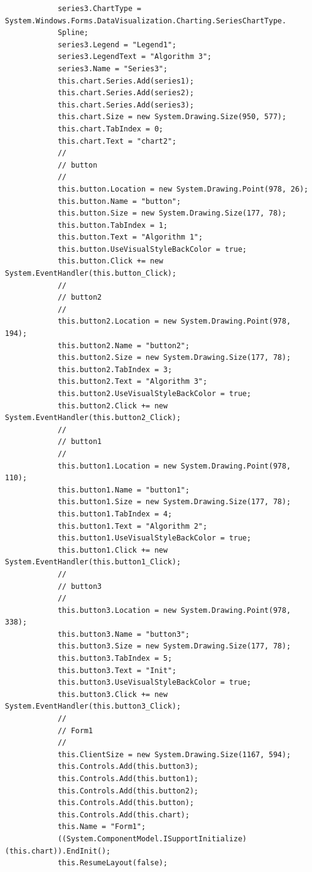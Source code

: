 \documentclass[a4paper]{article}
\begin{document}
\begin{verbatim}
            series3.ChartType = System.Windows.Forms.DataVisualization.Charting.SeriesChartType.
            Spline;
            series3.Legend = "Legend1";
            series3.LegendText = "Algorithm 3";
            series3.Name = "Series3";
            this.chart.Series.Add(series1);
            this.chart.Series.Add(series2);
            this.chart.Series.Add(series3);
            this.chart.Size = new System.Drawing.Size(950, 577);
            this.chart.TabIndex = 0;
            this.chart.Text = "chart2";
            // 
            // button
            // 
            this.button.Location = new System.Drawing.Point(978, 26);
            this.button.Name = "button";
            this.button.Size = new System.Drawing.Size(177, 78);
            this.button.TabIndex = 1;
            this.button.Text = "Algorithm 1";
            this.button.UseVisualStyleBackColor = true;
            this.button.Click += new System.EventHandler(this.button_Click);
            // 
            // button2
            // 
            this.button2.Location = new System.Drawing.Point(978, 194);
            this.button2.Name = "button2";
            this.button2.Size = new System.Drawing.Size(177, 78);
            this.button2.TabIndex = 3;
            this.button2.Text = "Algorithm 3";
            this.button2.UseVisualStyleBackColor = true;
            this.button2.Click += new System.EventHandler(this.button2_Click);
            // 
            // button1
            // 
            this.button1.Location = new System.Drawing.Point(978, 110);
            this.button1.Name = "button1";
            this.button1.Size = new System.Drawing.Size(177, 78);
            this.button1.TabIndex = 4;
            this.button1.Text = "Algorithm 2";
            this.button1.UseVisualStyleBackColor = true;
            this.button1.Click += new System.EventHandler(this.button1_Click);
            // 
            // button3
            // 
            this.button3.Location = new System.Drawing.Point(978, 338);
            this.button3.Name = "button3";
            this.button3.Size = new System.Drawing.Size(177, 78);
            this.button3.TabIndex = 5;
            this.button3.Text = "Init";
            this.button3.UseVisualStyleBackColor = true;
            this.button3.Click += new System.EventHandler(this.button3_Click);
            // 
            // Form1
            // 
            this.ClientSize = new System.Drawing.Size(1167, 594);
            this.Controls.Add(this.button3);
            this.Controls.Add(this.button1);
            this.Controls.Add(this.button2);
            this.Controls.Add(this.button);
            this.Controls.Add(this.chart);
            this.Name = "Form1";
            ((System.ComponentModel.ISupportInitialize)(this.chart)).EndInit();
            this.ResumeLayout(false);


\end{verbatim}
\end{document}
